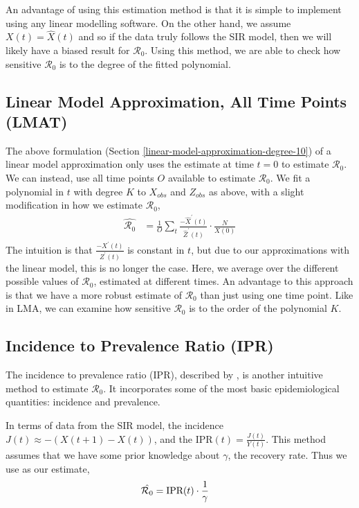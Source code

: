 \documentclass[12pt]{article}
\newcommand{\rr}{\ensuremath{\mathcal{R}_0}}
\begin{document}
  An advantage of using this estimation method is that it is simple to implement using any linear modelling software.  On the other hand, we assume $X(t) = \hat{X}(t)$ and so if the data truly follows the SIR model, then we will likely have a biased result for $\rr$.  Using this method, we are able to check how sensitive $\rr$ is to the degree of the fitted polynomial.

\subsection{Linear Model Approximation, All Time Points (LMAT)}\label{linear-model-approximation-all-time-points-degree-10}

The above formulation (Section \ref{linear-model-approximation-degree-10}) of a linear model approximation only uses the estimate at time $t=0$ to estimate $\rr$.  We can instead, use all time points $O$ available to estimate $\rr$.  We fit a polynomial in \(t\) with degree \(K\) to \(X_{obs}\)
and \(Z_{obs}\) as above, with a slight modification in how we estimate
\(\rr\),
\begin{align*}
  \hat{\rr} &= \frac{1}{O} \sum_t \frac{-\hat{X}^\prime(t)}{\hat{Z}^\prime(t)} \cdot \frac{N}{X(0)} 
\end{align*}
The intuition is that $\frac{-X^\prime(t)}{Z^\prime(t)}$ is constant in $t$, but due to our approximations with the linear model, this is no longer the case.  Here, we average over the different possible values of $\rr$, estimated at different times.  An advantage to this approach is that we have a more robust estimate of $\rr$ than just using one time point.  Like in LMA, we can examine how sensitive $\rr$ is to the order of the polynomial $K$.


\subsection{Incidence to Prevalence Ratio (IPR)}\label{incidence-to-prevalence-ratio}
The incidence to prevalence ratio (IPR), described by \cite{Nishiura2009}, is another intuitive method to estimate $\rr$.  It incorporates some of the most basic epidemiological quantities: incidence and prevalence.

In terms of data from the SIR model, the incidence $J(t) \approx -(X(t+1) - X(t))$, and the IPR$(t) = \frac{J(t)}{Y(t)}$.  This method assumes that we have some prior knowledge about $\gamma$, the recovery rate.  Thus we use as our estimate,
\begin{align*}
\hat{\rr} &= \textnormal{IPR}(t) \cdot \frac{1}{\gamma}
\end{align*}
\end{document}
